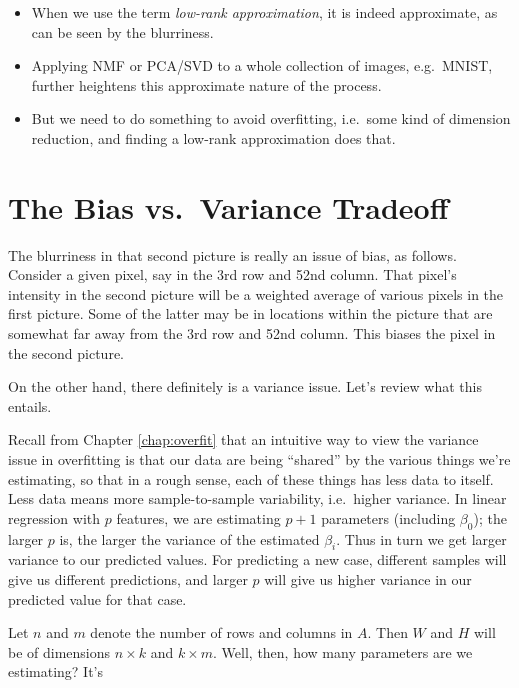 \begin{itemize}

\item When we use the term \textit{low-rank approximation}, it is indeed
approximate, as can be seen by the blurriness.  

\item Applying NMF or PCA/SVD to a whole collection of images, e.g.\
MNIST, further heightens this approximate nature of the process.

\item But we need to do something to avoid overfitting, i.e.\ some kind
of dimension reduction, and finding a low-rank approximation does that.

\end{itemize} 

\section{The Bias vs.\ Variance Tradeoff}

The blurriness in that second picture is really an issue of bias, as
follows.  Consider a given pixel, say in the 3rd row and 52nd column. 
That pixel's intensity in the second picture will be a weighted
average of various pixels in the first picture.  Some of the latter may
be in locations within the picture that are somewhat far away from the
3rd row and 52nd column.  This biases the pixel in the second picture.

On the other hand, there definitely is a variance issue.  Let's review
what this entails.

Recall from Chapter \ref{chap:overfit} that an intuitive way to view the
variance issue in overfitting is that our data are being ``shared'' by
the various things we're estimating, so that in a rough sense, each of
these things has less data to itself.  Less data means more
sample-to-sample variability, i.e.\ higher variance.  In linear
regression with $p$ features, we are estimating $p+1$ parameters
(including $\beta_0$); the larger $p$ is, the larger the variance of the
estimated $\beta_i$.  Thus in turn we get larger variance to our
predicted values.  For predicting a new case, different samples will
give us different predictions, and larger $p$ will give us higher
variance in our predicted value for that case.

Let $n$ and $m$ denote the number of rows and columns in $A$.  Then $W$
and $H$ will be of dimensions $n \times k$ and $k \times m$.  Well,
then, how many parameters are we estimating?  It's


